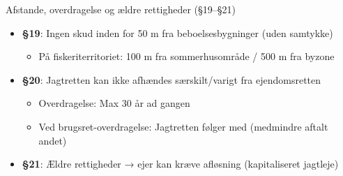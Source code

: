 
\begin{frame}{Afstande, overdragelse og ældre rettigheder (§19–§21)}
    \begin{itemize}
        \item \textbf{§19}: Ingen skud inden for 50 m fra beboelsesbygninger (uden samtykke)
          \begin{itemize}
            \item På fiskeriterritoriet: 100 m fra sommerhusområde / 500 m fra byzone
          \end{itemize}
        \item \textbf{§20}: Jagtretten kan ikke afhændes særskilt/varigt fra ejendomsretten
          \begin{itemize}
            \item Overdragelse: Max 30 år ad gangen
            \item Ved brugsret-overdragelse: Jagtretten følger med (medmindre aftalt andet)
          \end{itemize}
        \item \textbf{§21}: Ældre rettigheder → ejer kan kræve afløsning (kapitaliseret jagtleje)
    \end{itemize}
\end{frame}